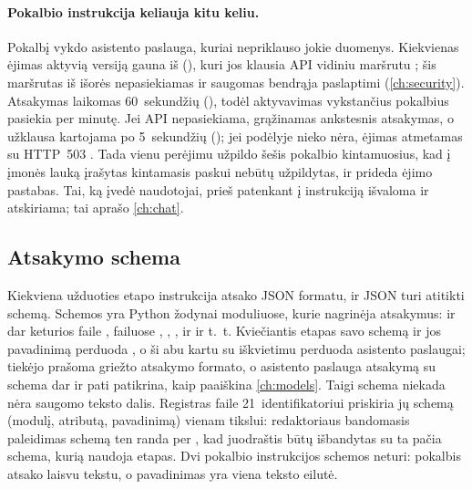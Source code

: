 \paragraph{Pokalbio instrukcija keliauja kitu keliu.} Pokalbį vykdo asistento paslauga, kuriai
nepriklauso jokie duomenys. Kiekvienas ėjimas aktyvią  versiją gauna iš
 (), kuri jos klausia API vidiniu maršrutu
; šis maršrutas iš išorės nepasiekiamas ir
saugomas bendrąja paslaptimi (\cref{ch:security}). Atsakymas laikomas 60~sekundžių
(), todėl aktyvavimas vykstančius pokalbius pasiekia per minutę. Jei API
nepasiekiama, grąžinamas ankstesnis atsakymas, o užklausa kartojama po 5~sekundžių
(); jei podėlyje nieko nėra, ėjimas atmetamas su HTTP~503
. Tada  vienu perėjimu užpildo šešis pokalbio
kintamuosius, kad į įmonės lauką įrašytas kintamasis paskui nebūtų užpildytas, ir
prideda ėjimo pastabas. Tai, ką įvedė naudotojai, prieš patenkant į instrukciją išvaloma ir
atskiriama; tai aprašo \cref{ch:chat}.

\subsection{Atsakymo schema}\label{sec:prompts:schemas}

Kiekviena užduoties etapo instrukcija atsako JSON formatu, ir JSON turi atitikti schemą. Schemos
yra Python žodynai moduliuose, kurie nagrinėja atsakymus:  ir dar keturios
faile ,  failuose ,
, ,  ir
 ir t.~t. Kviečiantis etapas savo schemą ir jos pavadinimą perduoda
, o ši abu kartu su iškvietimu perduoda asistento
paslaugai; tiekėjo prašoma griežto atsakymo formato, o asistento paslauga atsakymą su schema
dar ir pati patikrina, kaip paaiškina \cref{ch:models}. Taigi schema niekada nėra saugomo
teksto dalis. Registras  faile  21~identifikatoriui
priskiria jų schemą (modulį, atributą, pavadinimą) vienam tikslui: redaktoriaus bandomasis
paleidimas schemą ten randa per , kad juodraštis būtų išbandytas su ta pačia
schema, kurią naudoja etapas. Dvi pokalbio instrukcijos schemos neturi: pokalbis atsako
laisvu tekstu, o pavadinimas yra viena teksto eilutė.

